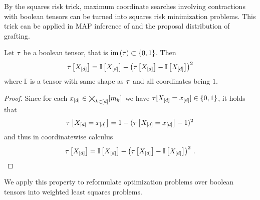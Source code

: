 



By the squares risk trick, maximum coordinate searches involving contractions with boolean tensors can be turned into squares risk minimization problems.
This trick can be applied in MAP inference of \HybridLogicNetworks{} and the proposal distribution of grafting.


\begin{lemma}
	Let $\tau$ be a boolean tensor, that is $\mathrm{im}\left(\tau\right)\subset\{0,1\}$.
	Then
		\[ \tau\left[X_{[d]}\right] = \mathbb{I}\left[X_{[d]}\right] - \left( \tau\left[X_{[d]}\right] - \mathbb{I}\left[X_{[d]}\right] \right)^2  \]
	where $\mathbb{I}$ is a tensor with same shape as $\tau$ and all coordinates being $1$.
\end{lemma}
\begin{proof}
	Since for each $x_{[d]}\in\bigtimes_{k\in[d]}[m_{k}]$ we have $\tau[X_{[d]}=x_{[d]}]\in\{0,1\}$, it holds that
		\[ \tau\left[X_{[d]}=x_{[d]}\right] = 1 - (\tau\left[X_{[d]}=x_{[d]}\right]-1)^2 \]
	and thus in coordinatewise calculus
		\[ \tau\left[X_{[d]}\right] = \mathbb{I}\left[X_{[d]}\right] - \left( \tau\left[X_{[d]}\right] - \mathbb{I}\left[X_{[d]}\right] \right)^2 \, .   \]
\end{proof}

We apply this property to reformulate optimization problems over boolean tensors into weighted least squares problems.

